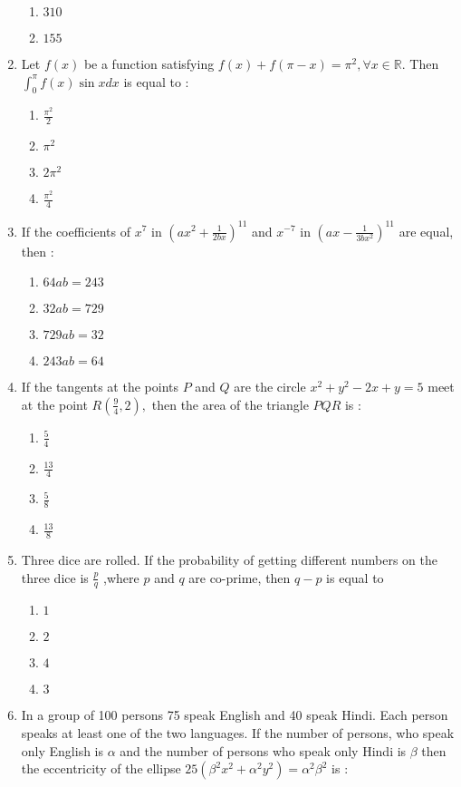\documentclass[journal,12pt,onecolumn]{IEEEtran}
\theoremstyle{remark}
\begin{document}
\begin{enumerate}
\begin{enumerate}
        \item $310$     
        \item $155$     
    \end{enumerate}
\item Let $f(x)$ be a function satisfying $f(x)+f(\pi -x)=\pi ^2,\forall x \in \mathbb{R}.$ Then $\int_0^{\pi} f(x) \sin x dx$ is equal to :
        \begin{enumerate}
        \item $\frac{\pi ^2}{2}$
        \item $\pi ^2$
        \item $2\pi ^2$
        \item $\frac{\pi ^2}{4}$
    \end{enumerate}
\item If the coefficients of $x^7$ in $\left( ax^2 + \frac{1}{2bx} \right)^{11}$ and $x^{-7}$ in $\left( ax - \frac{1}{3bx^2} \right)^{11}$ are equal, then :               
\begin{enumerate}
        \item $64 ab = 243$
        \item $32 ab = 729$
        \item $729 ab = 32$
        \item $243 ab = 64$
    \end{enumerate}
\item If the tangents at the points $P$ and $Q$ are the circle $ x^2 + y^2 -2x + y = 5 $ meet at the point $R\left( \frac{9}{4},2 \right) ,$ then the area of the triangle $PQR$ is :
\begin{enumerate}                  
        \item $\frac{5}{4}$    
        \item $\frac{13}{4}$
        \item $\frac{5}{8}$
        \item $\frac{13}{8}$
\end{enumerate}
\item Three dice are rolled. If the probability of getting different numbers on the three dice is
$\frac{p}{q}$ ,where $p$ and $q$ are co-prime, then $q-p$ is equal to 
        \begin{enumerate}
        \item $1$ 
        \item $2$
        \item $4$ 
        \item $3$
    \end{enumerate}
\item In a group of 100 persons 75 speak English and 40 speak Hindi. Each person speaks at least one of the two languages. If the number of persons, who speak only English is $\alpha$ and the number of persons who speak only Hindi is $\beta $ then the eccentricity of the ellipse $25 \left(\beta ^2 x^2 +\alpha ^2 y^2 \right) = \alpha ^2 \beta ^2$ is :

\end{enumerate}
\end{document}
